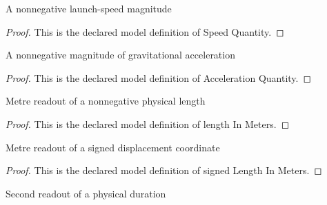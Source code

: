 \begin{definition}
  \label{def:physics:phyx-mini-0685:phyxminiproblems-problemphyxmini0685-speedquantity}
  A nonnegative launch-speed magnitude
\end{definition}
\begin{proof}
  This is the declared model definition of Speed Quantity.
\end{proof}
\begin{definition}
  \label{def:physics:phyx-mini-0685:phyxminiproblems-problemphyxmini0685-accelerationquantity}
  A nonnegative magnitude of gravitational acceleration
\end{definition}
\begin{proof}
  This is the declared model definition of Acceleration Quantity.
\end{proof}
\begin{definition}
  \label{def:physics:phyx-mini-0685:phyxminiproblems-problemphyxmini0685-lengthinmeters}
  Metre readout of a nonnegative physical length
\end{definition}
\begin{proof}
  This is the declared model definition of length In Meters.
\end{proof}
\begin{definition}
  \label{def:physics:phyx-mini-0685:phyxminiproblems-problemphyxmini0685-signedlengthinmeters}
  Metre readout of a signed displacement coordinate
\end{definition}
\begin{proof}
  This is the declared model definition of signed Length In Meters.
\end{proof}
\begin{definition}
  \label{def:physics:phyx-mini-0685:phyxminiproblems-problemphyxmini0685-timeinseconds}
  Second readout of a physical duration
\end{definition}
